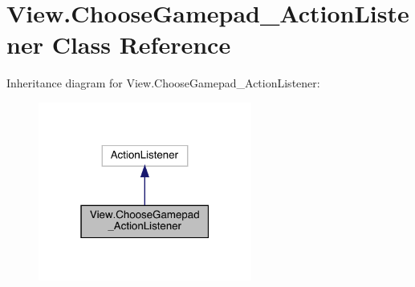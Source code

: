 \hypertarget{class_view_1_1_choose_gamepad___action_listener}{}\section{View.\+Choose\+Gamepad\+\_\+\+Action\+Listener Class Reference}
\label{class_view_1_1_choose_gamepad___action_listener}


Inheritance diagram for View.\+Choose\+Gamepad\+\_\+\+Action\+Listener\+:
\nopagebreak
\begin{figure}[H]
\begin{center}
\leavevmode
\includegraphics[width=199pt]{class_view_1_1_choose_gamepad___action_listener__inherit__graph}
\end{center}
\end{figure}


